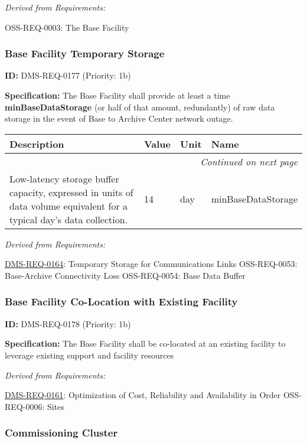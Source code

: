 \documentclass[SE,toc,lsstdraft]{lsstdoc}
\makeatletter
\newcommand{\paramname}[1]{\hspace{0pt}#1}
\newcommand{\unitname}[1]{\hspace{0pt}#1}
\newenvironment{parameters}[0]{%
\setlength\LTleft{0pt}
\setlength\LTright{\fill}
\begin{small}
\begin{longtable}[]{|p{0.49\textwidth}|l|p{0.6in}|p{1.70in}@{}|}

\hline \textbf{Description} & \textbf{Value} & \textbf{Unit} & \textbf{Name} \\ \hline
\endhead

\hline \multicolumn{4}{r}{\emph{Continued on next page}} \\
\endfoot

\hline\hline
\endlastfoot
}{%
\hline
\end{longtable}
\end{small}
}
\makeatother
\begin{document}
\emph{Derived from Requirements:}

OSS-REQ-0003:
The Base Facility \newline

\subsubsection{Base Facility Temporary Storage}

\label{DMS-REQ-0177}
\textbf{ID:} DMS-REQ-0177 (Priority: 1b)

\textbf{Specification:} The Base Facility shall provide at least a time \textbf{minBaseDataStorage }(or half of that amount, redundantly) of raw data storage in the event of Base to Archive Center network outage.

\begin{parameters}
Low-latency storage buffer capacity, expressed in units of data volume equivalent for a typical day's data collection.
&
14
&
\unitname{%
day
}
&
\paramname{%
minBaseDataStorage
} \\\hline
\end{parameters}

\emph{Derived from Requirements:}

\hyperref[DMS-REQ-0164]{DMS-REQ-0164}:
Temporary Storage for Communications Links \newline
OSS-REQ-0053:
Base-Archive Connectivity Loss \newline
OSS-REQ-0054:
Base Data Buffer \newline

\subsubsection{Base Facility Co-Location with Existing Facility}

\label{DMS-REQ-0178}
\textbf{ID:} DMS-REQ-0178 (Priority: 1b)

\textbf{Specification:} The Base Facility shall be co-located at an existing facility to leverage existing support and facility resources

\emph{Derived from Requirements:}

\hyperref[DMS-REQ-0161]{DMS-REQ-0161}:
Optimization of Cost, Reliability and Availability in Order \newline
OSS-REQ-0006:
Sites \newline

\subsubsection{Commissioning Cluster}
\end{document}

